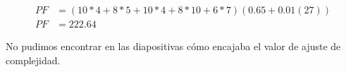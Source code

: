 \begin{align*}
  PF &= (10*4 + 8*5 + 10*4 + 8*10 + 6*7)(0.65 + 0.01(27)) \\
  PF &= 222.64
\end{align*}

No pudimos encontrar en las diapositivas cómo encajaba el valor de ajuste de complejidad.
